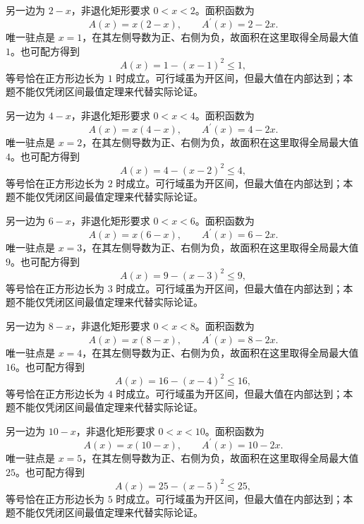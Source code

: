 \documentclass[UTF8,12pt,a4paper,fontset=fandol]{ctexart}
\begin{document}
\begin{solve}\label{ans:c11q8}
另一边为 $2-x$，非退化矩形要求 $0<x<2$。面积函数为
\[
A(x)=x(2-x),\qquad A^{\prime}(x)=2-2x.
\]
唯一驻点是 $x=1$，在其左侧导数为正、右侧为负，故面积在这里取得全局最大值 $1$。也可配方得到
\[
A(x)=1-(x-1)^2\le 1,
\]
等号恰在正方形边长为 $1$ 时成立。可行域虽为开区间，但最大值在内部达到；本题不能仅凭闭区间最值定理来代替实际论证。
\end{solve}

\begin{solve}\label{ans:c11q9}
另一边为 $4-x$，非退化矩形要求 $0<x<4$。面积函数为
\[
A(x)=x(4-x),\qquad A^{\prime}(x)=4-2x.
\]
唯一驻点是 $x=2$，在其左侧导数为正、右侧为负，故面积在这里取得全局最大值 $4$。也可配方得到
\[
A(x)=4-(x-2)^2\le 4,
\]
等号恰在正方形边长为 $2$ 时成立。可行域虽为开区间，但最大值在内部达到；本题不能仅凭闭区间最值定理来代替实际论证。
\end{solve}

\begin{solve}\label{ans:c11q10}
另一边为 $6-x$，非退化矩形要求 $0<x<6$。面积函数为
\[
A(x)=x(6-x),\qquad A^{\prime}(x)=6-2x.
\]
唯一驻点是 $x=3$，在其左侧导数为正、右侧为负，故面积在这里取得全局最大值 $9$。也可配方得到
\[
A(x)=9-(x-3)^2\le 9,
\]
等号恰在正方形边长为 $3$ 时成立。可行域虽为开区间，但最大值在内部达到；本题不能仅凭闭区间最值定理来代替实际论证。
\end{solve}

\begin{solve}\label{ans:c11q11}
另一边为 $8-x$，非退化矩形要求 $0<x<8$。面积函数为
\[
A(x)=x(8-x),\qquad A^{\prime}(x)=8-2x.
\]
唯一驻点是 $x=4$，在其左侧导数为正、右侧为负，故面积在这里取得全局最大值 $16$。也可配方得到
\[
A(x)=16-(x-4)^2\le 16,
\]
等号恰在正方形边长为 $4$ 时成立。可行域虽为开区间，但最大值在内部达到；本题不能仅凭闭区间最值定理来代替实际论证。
\end{solve}

\begin{solve}\label{ans:c11q12}
另一边为 $10-x$，非退化矩形要求 $0<x<10$。面积函数为
\[
A(x)=x(10-x),\qquad A^{\prime}(x)=10-2x.
\]
唯一驻点是 $x=5$，在其左侧导数为正、右侧为负，故面积在这里取得全局最大值 $25$。也可配方得到
\[
A(x)=25-(x-5)^2\le 25,
\]
等号恰在正方形边长为 $5$ 时成立。可行域虽为开区间，但最大值在内部达到；本题不能仅凭闭区间最值定理来代替实际论证。
\end{solve}
\end{document}
